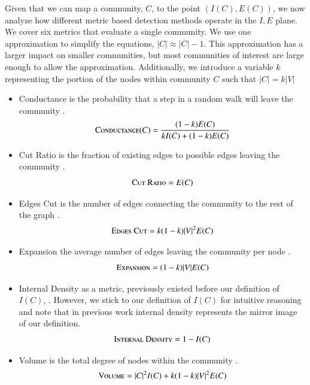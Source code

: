 \documentclass[phd,tocprelim]{cornell}
\begin{document}
Given that we can map a community, $C$, to the point $(I(C), E(C))$, we now analyze how different metric based detection methods operate in the $I,E$ plane.  We cover six metrics that evaluate a single community.  We use one approximation to simplify the equations, $|C| \approx |C| - 1$.  This approximation has a larger impact on smaller communities, but most communities of interest are large enough to allow the approximation.  Additionally, we introduce a variable $k$ representing the portion of the nodes within community $C$ such that $|C| = k |V|$
\begin{itemize}
\item {\sc Conductance} is the probability that a step in a random walk will leave the community \cite{JTODO}.
\begin{equation}
\mbox{\sc Conductance}(C) = \frac{(1 - k)E(C)}{kI(C) + (1 - k)E(C)}
\end{equation}
\item {\sc Cut Ratio} is the fraction of existing edges to possible edges leaving the community \cite{JTODO}.
\begin{equation}
\mbox{\sc Cut Ratio} = E(C)
\end{equation}
\item {\sc Edges Cut} is the number of edges connecting the community to the rest of the graph \cite{JTODO}.\begin{equation}
\mbox{\sc Edges Cut} = k (1-k) |V|^2 E(C)
\end{equation}
\item {\sc Expansion} the average number of edges leaving the community per node \cite{JTODO}.
\begin{equation}
\mbox{\sc Expansion} = (1 - k)|V |E(C)
\end{equation}
\item {\sc Internal Density} as a metric, previously existed before our definition of $I(C)$, \cite{JTODO}.  However, we stick to our definition of $I(C)$ for intuitive reasoning and note that in previous work internal density represents the mirror image of our definition.
\begin{equation}
\mbox{\sc Internal Density} = 1 - I(C)
\end{equation}
\item {\sc Volume} is the total degree of nodes within the community \cite{JTODO}.
\begin{equation}
\mbox{\sc Volume} = |C|^2 I(C) + k(1-k)|V|^2E(C)
\end{equation}
\end{itemize}
\end{document}
